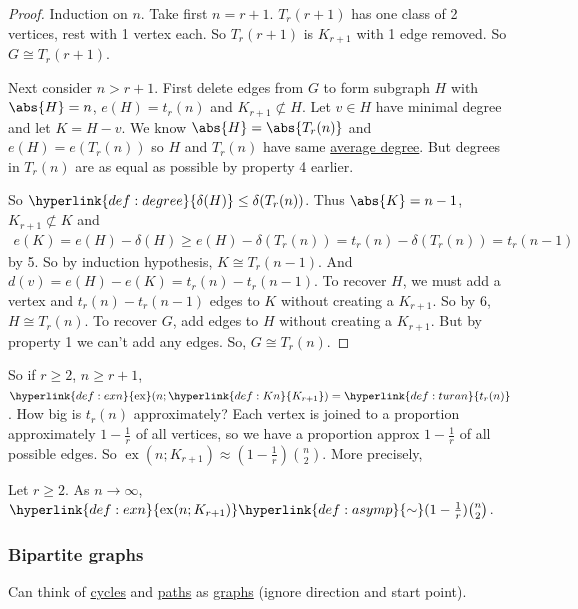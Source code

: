 \documentclass{article}
\DeclareMathOperator{\ext}{ex}
\begin{document}
\begin{proof}
    Induction on $n$.
    Take first $n = r+1$. $T_r(r+1)$ has one class of 2 vertices, rest with 1 vertex each. So $T_r(r+1)$ is $K_{r+1}$ with 1 edge removed. So $G \cong T_r(r+1)$.

    Next consider $n > r+1$. First delete edges from $G$ to form subgraph $H$ with $\abs{H} = n$, $e(H) = t_r(n)$ and $K_{r+1} \not \subset H$. Let $v \in H$ have minimal degree and let $K = H- v$.
    We know $\abs{H} = \abs{T_r(n)}$ and $e(H) = e(T_r(n))$ so $H$ and $T_r(n)$ have same \hyperlink{def:degree}{average degree}. But degrees in $T_r(n)$ are as equal as possible by property 4 earlier.

    So $\hyperlink{def:degree}{\delta(H)} \leq \delta(T_r(n))$. Thus $\abs{K} = n-1$, $K_{r+1} \not\subset K$ and \begin{align*}e(K) = e(H) - \delta (H) \geq e(H) - \delta(T_r(n)) = t_r(n) - \delta(T_r(n)) = t_r(n-1)\end{align*} by 5.
    So by induction hypothesis, $K \cong T_r(n-1)$. And $d(v) = e(H) - e(K) = t_r(n) - t_r(n-1)$.
    To recover $H$, we must add a vertex and $t_r(n) - t_r(n-1)$ edges to $K$ without creating a $K_{r+1}$. So by 6, $H \cong T_r(n)$.
    To recover $G$, add edges to $H$ without creating a $K_{r+1}$. But by property 1 we can't add any edges. So, $G \cong T_r(n)$.
\end{proof}

So if $r \geq 2$, $n \geq r+1$, $\hyperlink{def:exn}{\ext}(n; \hyperlink{def:Kn}{K_{r+1}}) = \hyperlink{def:turan}{t_r(n)}$.
How big is $t_r(n)$ approximately?
Each vertex is joined to a proportion approximately $1 - \frac{1}{r}$ of all vertices, so we have a proportion approx $1 - \frac{1}{r}$ of all possible edges. So $\ext(n; K_{r+1}) \approx (1-\frac{1}{r}) \binom{n}{2}$.
More precisely,

\begin{ncor}\label{cor:10}
    Let $r \geq 2$. As $n \to \infty$, $\hyperlink{def:exn}{\ext(n; K_{r+1})} \hyperlink{def:asymp}{\sim} (1 - \frac{1}{r}) \binom{n}{2}$.
\end{ncor}

\subsubsection{Bipartite graphs}
Can think of \hyperlink{def:cycle}{cycles} and \hyperlink{def:path}{paths} as \hyperlink{def:graph}{graphs} (ignore direction and start point).
\end{document}
